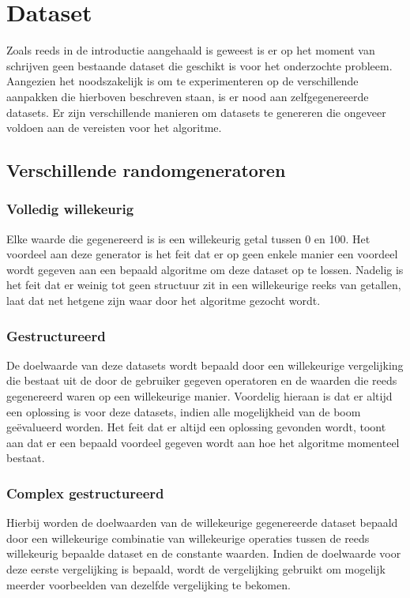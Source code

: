 \documentclass[Main.tex]{subfiles}
\begin{document}
\section{Dataset}

Zoals reeds in de introductie aangehaald is geweest is er op het moment van schrijven geen bestaande dataset die geschikt is voor het onderzochte probleem. Aangezien het noodszakelijk is om te experimenteren op de verschillende aanpakken die hierboven beschreven staan, is er nood aan zelfgegenereerde datasets. Er zijn verschillende manieren om datasets te genereren die ongeveer voldoen aan de vereisten voor het algoritme.
  
\subsection{Verschillende randomgeneratoren}
\subsubsection*{Volledig willekeurig}
Elke waarde die gegenereerd is is een willekeurig getal tussen 0 en 100. Het voordeel aan deze generator is het feit dat er op geen enkele manier een voordeel wordt gegeven aan een bepaald algoritme om deze dataset op te lossen. Nadelig is het feit dat er weinig tot geen structuur zit in een willekeurige reeks van getallen, laat dat net hetgene zijn waar door het algoritme gezocht wordt.

\subsubsection*{Gestructureerd}
De doelwaarde van deze datasets wordt bepaald door een willekeurige vergelijking die bestaat uit de door de gebruiker gegeven operatoren en de waarden die reeds gegenereerd waren op een willekeurige manier. Voordelig hieraan is dat er altijd een oplossing is voor deze datasets, indien alle mogelijkheid van de boom ge\"evalueerd worden. Het feit dat er altijd een oplossing gevonden wordt, toont aan dat er een bepaald voordeel gegeven wordt aan hoe het algoritme momenteel bestaat.

\subsubsection*{Complex gestructureerd}
Hierbij worden de doelwaarden van de willekeurige gegenereerde dataset bepaald door een willekeurige combinatie van willekeurige operaties tussen de reeds willekeurig bepaalde dataset en de constante waarden. Indien de doelwaarde voor deze eerste vergelijking is bepaald, wordt de vergelijking gebruikt om mogelijk meerder voorbeelden van dezelfde vergelijking te bekomen. 
\end{document}
